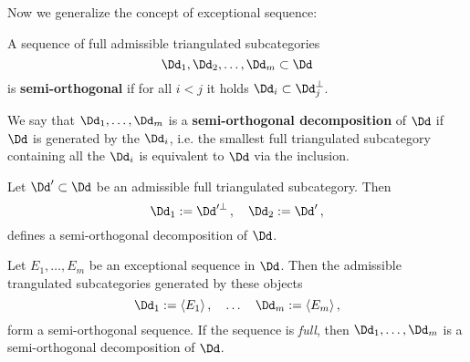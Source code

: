 Now we generalize the concept of exceptional sequence:

\begin{df}
    A sequence of full admissible triangulated subcategories
    \begin{equation*}
        \Dd_{1}, \Dd_{2}, \dots, \Dd_{m} \subset \Dd
    \end{equation*}
    is \textbf{semi-orthogonal} if for all $i < j$ 
    it holds $\Dd_{i} \subset \Dd_{j}^{\perp}$.

    We say that $\Dd_{1}, \dots, \Dd_{m}$ is a 
    \textbf{semi-orthogonal decomposition} of $\Dd$
    if $\Dd$ is generated by the $\Dd_{i}$, i.e.
    the smallest full triangulated subcategory containing
    all the $\Dd_{i}$ is equivalent to $\Dd$ via the inclusion.
\end{df}

\begin{ex}
    Let $\Dd' \subset \Dd$ be an admissible full triangulated
    subcategory. Then
    \begin{equation*}
        \Dd_{1} := \Dd'^{\perp}\,, \quad \Dd_{2} := \Dd'\,,
    \end{equation*}
    defines a semi-orthogonal decomposition of $\Dd$.
\end{ex}

\begin{ex}
    Let $E_{1}, \dots, E_{m}$ be an exceptional sequence in $\Dd$.
    Then the admissible trangulated subcategories generated by these objects
    \begin{equation*}
        \Dd_{1} := \langle E_{1} \rangle\,, \quad \dots \quad
        \Dd_{m} := \langle E_{m} \rangle\,,
    \end{equation*}
    form a semi-orthogonal sequence.
    If the sequence is \emph{full}, then $\Dd_{1}, \dots, \Dd_{m}$
    is a semi-orthogonal decomposition of $\Dd$.
\end{ex}


